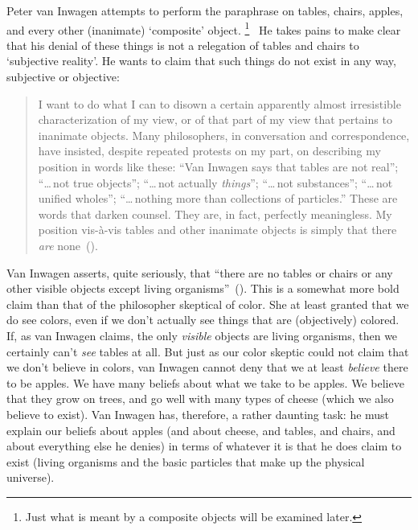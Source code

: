 \documentclass[11pt]{article}
\newenvironment{squote}{\begin{quote}\begin{singlespace}}{\end{singlespace}\end{quote}}
\begin{document}
\begin{spacing}{1.5}
Peter van Inwagen attempts to perform the paraphrase on tables, chairs, apples, and every other (inanimate) `composite' object.%
%
\footnote{Just what is meant by a composite objects will be examined later.}
%
\ He takes pains to make clear that his denial of these things is not a relegation of tables and chairs to `subjective reality'. He wants to claim that such things do not exist in any way, subjective or objective:
\begin{squote}
I want to do what I can to disown a certain apparently almost irresistible characterization of my view, or of that part of my view that pertains to inanimate objects. Many philosophers, in conversation and correspondence, have insisted, despite repeated protests on my part, on describing my position in words like these: ``Van Inwagen says that tables are not real''; ``\ldots\,not true objects''; ``\ldots\,not actually {\em things}''; ``\ldots\,not substances''; ``\ldots\,not unified wholes''; ``\ldots\,nothing more than collections of particles.'' These are words that darken counsel. They are, in fact, perfectly meaningless. My position vis-\`{a}-vis tables and other inanimate objects is simply that there {\em are} none~(\citeyear[99]{inwagen1995}).
\end{squote}
Van Inwagen asserts, quite seriously, that ``there are no tables or chairs or any other visible objects except living organisms''~(\citeyear[1]{inwagen1995}). This is a somewhat more bold claim than that of the philosopher skeptical of color. She at least granted that we do see colors, even if we don't actually see things that are (objectively) colored. If, as van Inwagen claims, the only {\em visible} objects are living organisms, then we certainly can't {\em see} tables at all. But just as our color skeptic could not claim that we don't believe in colors, van Inwagen cannot deny that we at least {\em believe} there to be apples. We have many beliefs about what we take to be apples. We believe that they grow on trees, and go well with many types of cheese (which we also believe to exist). Van Inwagen has, therefore, a rather daunting task: he must explain our beliefs about apples (and about cheese, and tables, and chairs, and about everything else he denies) in terms of whatever it is that he does claim to exist (living organisms and the basic particles that make up the physical universe).
%
%


\end{spacing}
\end{document}
